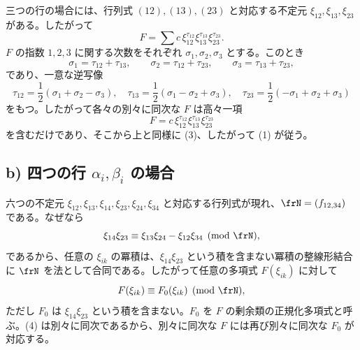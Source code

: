 \documentclass[11pt]{article}
\begin{document}
三つの行の場合には、行列式 \((12),(13),(23)\) と対応する不定元 \(\xi_{12},\xi_{13},\xi_{23}\) がある。したがって
\[
        F=\sum c\,\xi_{12}^{\tau_{12}}\xi_{13}^{\tau_{13}}\xi_{23}^{\tau_{23}}.
\]
\(F\) の指数 \(1,2,3\) に関する次数をそれぞれ \(\sigma_1,\sigma_2,\sigma_3\) とする。このとき
\[
        \sigma_1=\tau_{12}+\tau_{13},\qquad
        \sigma_2=\tau_{12}+\tau_{23},\qquad
        \sigma_3=\tau_{13}+\tau_{23},
\]
であり、一意な逆写像
\[
        \tau_{12}=\frac12(\sigma_1+\sigma_2-\sigma_3),\quad
        \tau_{13}=\frac12(\sigma_1-\sigma_2+\sigma_3),\quad
        \tau_{23}=\frac12(-\sigma_1+\sigma_2+\sigma_3)
\]
をもつ。したがって各々の別々に同次な \(F\) は高々一項
\[
        F=c\,\xi_{12}^{\tau_{12}}\xi_{13}^{\tau_{13}}\xi_{23}^{\tau_{23}}
\]
を含むだけであり、そこから上と同様に (3)、したがって (1) が従う。

\subsection*{b) 四つの行 \(\alpha_i,\beta_i\) の場合}

六つの不定元 \(\xi_{12},\xi_{13},\xi_{14},\xi_{23},\xi_{24},\xi_{34}\) と対応する行列式が現れ、\(\frN=(f_{12,34})\) である。なぜなら
\begin{equation}
        \xi_{14}\xi_{23}\equiv \xi_{13}\xi_{24}-\xi_{12}\xi_{34}\pmod{\frN},
\end{equation}
であるから、任意の \(\xi_{ik}\) の冪積は、\(\xi_{14}\xi_{23}\) という積を含まない冪積の整線形結合に \(\frN\) を法として合同である。したがって任意の多項式 \(F(\xi_{ik})\) に対して
\begin{equation}
        F(\xi_{ik})\equiv F_0(\xi_{ik})\pmod{\frN},
\end{equation}
ただし \(F_0\) は \(\xi_{14}\xi_{23}\) という積を含まない。\(F_0\) を \(F\) の剰余類の正規化多項式と呼ぶ。(4) は別々に同次であるから、別々に同次な \(F\) には再び別々に同次な \(F_0\) が対応する。
\end{document}
